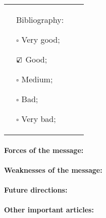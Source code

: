 \documentclass[11pt]{article}
\begin{document}
\begin{tabular}{p{}p{}p{}p{}}
&

\begin{minipage}[t]{.25\textwidth}
Bibliography:
\begin{description}
\item $\square$ Very good;
\item $\mbox{\ooalign{$\checkmark$\cr\hidewidth$\square$\hidewidth\cr}}$ Good;
\item $\square$ Medium;
\item $\square$ Bad;
\item $\square$ Very bad;
\end{description}
\end{minipage}
\end{tabular}

\paragraph{Forces of the message:}

\paragraph{Weaknesses of the message:}

\paragraph{Future directions:}

\paragraph{Other important articles:}
\end{document}
